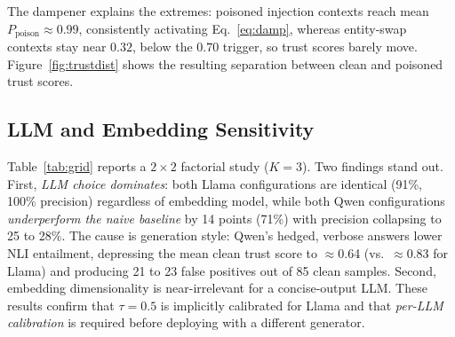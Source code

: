 

The dampener explains the extremes: poisoned injection contexts reach mean $P_{\text{poison}}\approx0.99$, consistently activating Eq.~\ref{eq:damp}, whereas entity-swap contexts stay near $0.32$, below the $0.70$ trigger, so trust scores barely move. Figure~\ref{fig:trustdist} shows the resulting separation between clean and poisoned trust scores.



\subsection{LLM and Embedding Sensitivity}
\label{sec:grid}
Table~\ref{tab:grid} reports a $2\times2$ factorial study ($K{=}3$). Two findings stand out. First, \emph{LLM choice dominates}: both Llama configurations are identical (91\%, 100\% precision) regardless of embedding model, while both Qwen configurations \emph{underperform the naive baseline} by 14 points (71\%) with precision collapsing to 25 to 28\%. The cause is generation style: Qwen's hedged, verbose answers lower NLI entailment, depressing the mean clean trust score to $\approx$0.64 (vs.\ $\approx$0.83 for Llama) and producing 21 to 23 false positives out of 85 clean samples. Second, embedding dimensionality is near-irrelevant for a concise-output LLM. These results confirm that $\tau{=}0.5$ is implicitly calibrated for Llama and that \emph{per-LLM calibration} is required before deploying with a different generator.

\begin{table}[!ht]
\caption{$2\times2$ LLM\,$\times$\,embedding grid (TruthfulQA, 100 samples,
mixed, $K{=}3$).}
\label{tab:grid}
\centering {}
\end{table}

